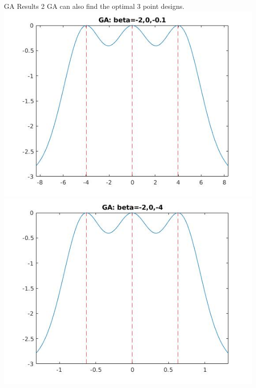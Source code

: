 \documentclass[11pt]{beamer}
\begin{document}
\begin{frame}{GA Results 2}
GA can also find the optimal 3 point designs.
\includegraphics[scale=0.28]{quadplots/GA_3.jpg}
\includegraphics[scale=0.28]{quadplots/GA_4.jpg}
\end{frame}
\end{document}

